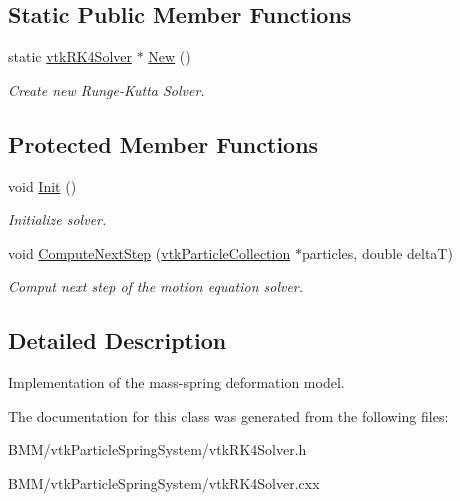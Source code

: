 \subsection*{Static Public Member Functions}
\begin{DoxyCompactItemize}
\item 
\hypertarget{classvtkRK4Solver_a60e176bfaeb153a20c01e4c478420063}{
static \hyperlink{classvtkRK4Solver}{vtkRK4Solver} $\ast$ \hyperlink{classvtkRK4Solver_a60e176bfaeb153a20c01e4c478420063}{New} ()}
\label{classvtkRK4Solver_a60e176bfaeb153a20c01e4c478420063}

\begin{DoxyCompactList}\small\item\em Create new Runge-\/Kutta Solver. \item\end{DoxyCompactList}\end{DoxyCompactItemize}
\subsection*{Protected Member Functions}
\begin{DoxyCompactItemize}
\item 
\hypertarget{classvtkRK4Solver_a6ee3472046abd434f4c11859e3351a81}{
void \hyperlink{classvtkRK4Solver_a6ee3472046abd434f4c11859e3351a81}{Init} ()}
\label{classvtkRK4Solver_a6ee3472046abd434f4c11859e3351a81}

\begin{DoxyCompactList}\small\item\em Initialize solver. \item\end{DoxyCompactList}\item 
\hypertarget{classvtkRK4Solver_ae6198e2dd25c00b67b7cb7cbeb144665}{
void \hyperlink{classvtkRK4Solver_ae6198e2dd25c00b67b7cb7cbeb144665}{ComputeNextStep} (\hyperlink{classvtkParticleCollection}{vtkParticleCollection} $\ast$particles, double deltaT)}
\label{classvtkRK4Solver_ae6198e2dd25c00b67b7cb7cbeb144665}

\begin{DoxyCompactList}\small\item\em Comput next step of the motion equation solver. \item\end{DoxyCompactList}\end{DoxyCompactItemize}


\subsection{Detailed Description}
Implementation of the mass-\/spring deformation model. 

The documentation for this class was generated from the following files:\begin{DoxyCompactItemize}
\item 
BMM/vtkParticleSpringSystem/vtkRK4Solver.h\item 
BMM/vtkParticleSpringSystem/vtkRK4Solver.cxx\end{DoxyCompactItemize}
